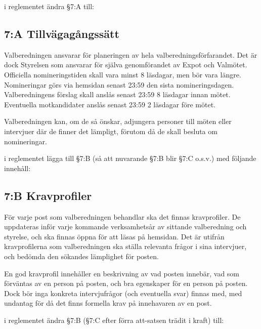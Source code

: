 \documentclass[../_main/handlingar.tex]{subfiles}
\begin{document}
\begin{attsatser}
    \att i reglementet ändra \S7:A till:\par
        \subsection*{7:A Tillvägagångssätt}
        Valberedningen ansvarar för planeringen av hela valberedningsförfarandet. Det är dock Styrelsen som ansvarar för själva genomförandet av Expot och Valmötet. Officiella nomineringstiden skall vara minst 8 läsdagar, men bör vara längre. Nomineringar görs via hemsidan senast 23:59 den sista nomineringsdagen. Valberedningens förslag skall anslås senast 23:59 8 läsdagar innan mötet. Eventuella motkandidater anslås senast 23:59 2 läsdagar före mötet.

        Valberedningen kan, om de så önskar, adjungera personer till möten eller intervjuer där de finner det lämpligt, förutom då de skall besluta om nomineringar.

    \newpage

    \att i reglementet lägga till \S7:B (så att nuvarande \S7:B blir \S7:C o.s.v.) med följande innehåll:
        \subsection*{7:B Kravprofiler}
        För varje post som valberedningen behandlar ska det finnas kravprofiler. De uppdateras inför varje kommande verksamhetsår av sittande valberedning och styrelse, och ska finnas öppna för att läsas på hemsidan. Det är utifrån kravprofilerna som valberedningen ska ställa relevanta frågor i sina intervjuer, och bedömda den sökandes lämplighet för posten.

        En god kravprofil innehåller en beskrivning av vad posten innebär, vad som förväntas av en person på posten, och bra egenskaper för en person på posten. Dock bör inga konkreta intervjufrågor (och eventuella svar) finnas med, med undantag för då det finns formella krav på innehavaren av en post.

    \att i reglementet ändra \S7:B (\S7:C efter förra att-satsen trädit i kraft) till:\par

\end{attsatser}
\end{document}
